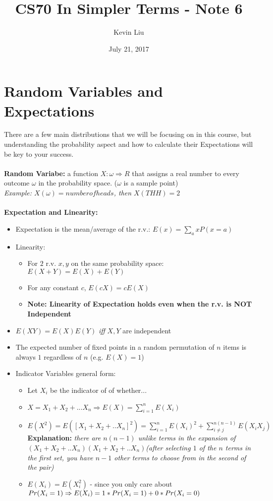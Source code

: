 \documentclass[a4paper]{article}
\title{CS70 In Simpler Terms - Note 6}
\author{Kevin Liu}
\date{July 21, 2017}
\begin{document}
\maketitle

\section{Random Variables and Expectations}
There are a few main distributions that we will be focusing on in this course, but understanding the probability aspect and how to calculate their Expectations will be key to your success.\\\\
\textbf{Random Variabe:} a function $X: \omega \Rightarrow R$ that assigns a real number to every outcome $\omega$ in the probability space. ($\omega$ is a sample point) \\
\indent \textit{Example: $X(\omega) = number of heads$, then $X(THH) = 2$}\\\\
\textbf{Expectation and Linearity:}
\begin{itemize}
    \item Expectation is the mean/average of the r.v.: $E(x)= \sum_a xP(x=a)$
    \item Linearity:
    \begin{itemize}
        \item For $2$ r.v. $x,y$ on the same probability space: $E(X+Y) = E(X) + E(Y)$
        \item For any constant $c$, $E(cX) = cE(X)$
        \item \textbf{Note: Linearity of Expectation holds even when the r.v. is NOT Independent}
    \end{itemize}
    \item $E(XY) = E(X)E(Y)$ \textit{iff} $X,Y$ are independent
    \item The expected number of fixed points in a random permutation of $n$ items is always $1$ regardless of $n$ (e.g. $E(X) = 1$)
    \item Indicator Variables general form:\\
    \begin{itemize}
        \item Let $X_i$ be the indicator of of whether...
        \item $X = X_1 + X_2 + ... X_n \Rightarrow E(X) = \sum_{i=1}^n E(X_i)$
        \item $E(X^2) = E([X_1 + X_2 + .. X_n]^2) = \sum_{i=1}^n E(X_i)^2 + \sum_{i\neq j}^{n(n-1)}E(X_i X_j)$ \textbf{Explanation:} \textit{there are $n(n-1)$ unlike terms in the expansion of $(X_1 + X_2 + .. X_n)(X_1 + X_2 + .. X_n)$(after selecting $1$ of the $n$ terms in the first set, you have $n-1$ other terms to choose from in the second of the pair)}
        \item $E(X_i) = E(X_i^2)$ - since you only care about $Pr(X_i=1) \Rightarrow \\E(X_i) = 1 * Pr(X_i = 1) + 0 * Pr(X_i = 0)$
        
    \end{itemize}

\end{itemize}
\end{document}
